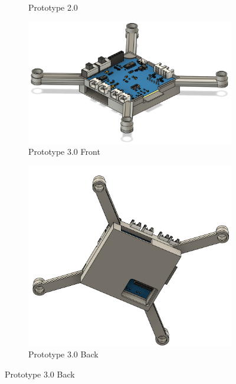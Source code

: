 \begin{figure}[H]
\begin{subfigure}[b]{0.48\linewidth}
        \caption{Prototype 2.0}
        \label{fig:frame-proto2}
    \end{subfigure}
    \hfill
    \begin{subfigure}[b]{0.48\linewidth}
        \centering
        \includegraphics[width=\linewidth]{img/frame-3.png}
        \caption{Prototype 3.0 Front}
        \label{fig:frame-proto3-front}
    \end{subfigure}
    \vspace{0.3cm}
    \begin{subfigure}[b]{0.48\linewidth}
        \centering
        \includegraphics[width=\linewidth]{img/frame-3-back.png}
        \caption{Prototype 3.0 Back}
        \label{fig:frame-proto3-back}
    \end{subfigure}
    \label{fig:frame-prototypes}
\end{figure}

